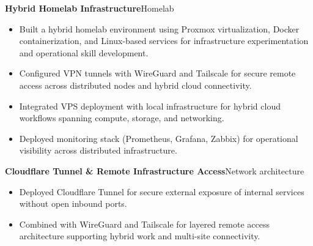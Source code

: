 \textbf{Hybrid Homelab Infrastructure}\hfill {\color{SecondaryText}\small Homelab}\par
\begin{itemize}
  \item Built a hybrid homelab environment using Proxmox virtualization, Docker containerization, and Linux-based services for infrastructure experimentation and operational skill development.
  \item Configured VPN tunnels with WireGuard and Tailscale for secure remote access across distributed nodes and hybrid cloud connectivity.
  \item Integrated VPS deployment with local infrastructure for hybrid cloud workflows spanning compute, storage, and networking.
  \item Deployed monitoring stack (Prometheus, Grafana, Zabbix) for operational visibility across distributed infrastructure.
\end{itemize}

\textbf{Cloudflare Tunnel \& Remote Infrastructure Access}\hfill {\color{SecondaryText}\small Network architecture}\par
\begin{itemize}
  \item Deployed Cloudflare Tunnel for secure external exposure of internal services without open inbound ports.
  \item Combined with WireGuard and Tailscale for layered remote access architecture supporting hybrid work and multi-site connectivity.
\end{itemize}
